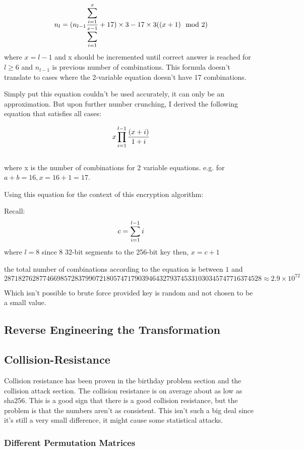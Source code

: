 \documentclass[fleqn, a4paper,12pt]{article}
\begin{document}
\[
		\\ n_l = (n_{l-1} \frac{\displaystyle \sum_{i=1}^{x}}{\displaystyle \sum_{i=1}^{x-1}} +17) \times 3 - 17 \times 3( (x+1) \mod 2 )
\]
where $x = l-1$ \quad and x should be incremented until correct answer is reached for $l \geq 6$ and $n_{l-1}$ is previous number of combinations.
This formula doesn't translate to cases where the 2-variable equation doesn't have 17 combinations.

Simply put this equation couldn't be used accurately, it can only be an approximation. But upon further number crunching, I derived the following equation that satisfies all cases:

\[
\\ x \prod_{i=1}^{l-1} \frac{(x+i)}{1+i}
\]
\\
where x is the number of combinations for 2 variable equations. e.g. for $a+b = 16, x = 16+1 = 17$.

Using this equation for the context of this encryption algorithm:

Recall:
\[
\\ c = \sum_{i=1}^{l-1} i
\]
where $l=8$ since 8 32-bit segments to the 256-bit key
then, $x = c + 1$

the total number of combinations according to the equation is between $1$ and \\$2871827628774669857283799072180574717903946432793745331030345747716374528 \approx 2.9 \times 10^{72}$

Which isn't possible to brute force provided key is random and not chosen to be a small value.

\subsection{Reverse Engineering the Transformation}

\subsection{Collision-Resistance}

Collision resistance has been proven in the birthday problem section and the collision attack section. The collision resistance is on average about as low as sha256. This is a good sign that there is a good collision resistance, but the problem is that the numbers aren't as consistent. This isn't such a big deal since it's still a very small difference, it might cause some statistical attacks. 

\subsubsection{Different Permutation Matrices}
\end{document}

